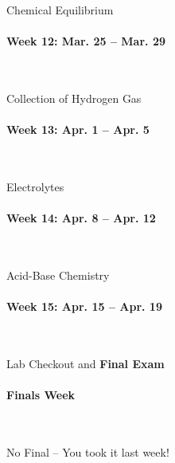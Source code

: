 \documentclass[12pt, letterpaper]{article}
\begin{document}
Chemical Equilibrium

\paragraph{Week 12: Mar. 25 -- Mar. 29}~

Collection of Hydrogen Gas

\paragraph{Week 13: Apr. 1 -- Apr. 5}~

Electrolytes

\paragraph{Week 14: Apr. 8 -- Apr. 12}~

Acid-Base Chemistry

\paragraph{Week 15: Apr. 15 -- Apr. 19}~

Lab Checkout and \textbf{Final Exam}

\paragraph{Finals Week}~

No Final -- You took it last week!
\end{document}
